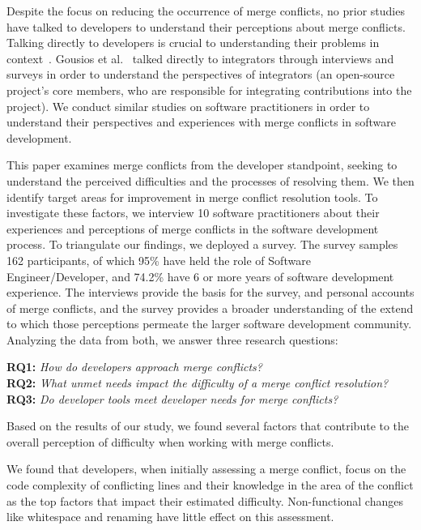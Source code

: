 Despite the focus on reducing the occurrence of merge conflicts, no prior studies have talked to developers to understand their perceptions about merge conflicts.
Talking directly to developers is crucial to understanding their problems in context~\cite{fritz2010using, sillito2006questions, de2008answering, ko2007information}.
Gousios et al.~\cite{integrator_perspective} talked directly to integrators through interviews and surveys in order to understand the perspectives of integrators (an open-source project's core members, who are responsible for integrating contributions into the project).
We conduct similar studies on software practitioners in order to understand their perspectives and experiences with merge conflicts in software development.

This paper examines merge conflicts from the developer standpoint, seeking to understand the perceived difficulties and the processes of resolving them.
We then identify target areas for improvement in merge conflict resolution tools.
To investigate these factors, we interview 10 software practitioners about their experiences and perceptions of merge conflicts in the software development process.
To triangulate our findings, we deployed a survey.
The survey samples 162 participants, of which 95\% have held the role of Software Engineer/Developer, and 74.2\% have 6 or more years of software development experience.
The interviews provide the basis for the survey, and personal accounts of merge conflicts, and the survey provides a broader understanding of the extend to which those perceptions permeate the larger software development community.
Analyzing the data from both, we answer three research questions:

\vspace{3px}
\noindent\textbf{RQ1:} \textit{How do developers approach merge conflicts?}\\
\noindent\textbf{RQ2:} \textit{What unmet needs impact the difficulty of a merge conflict resolution?}\\
\noindent\textbf{RQ3:} \textit{Do developer tools meet developer needs for merge conflicts?}
\vspace{3px}

Based on the results of our study, we found several factors that contribute to the overall perception of difficulty when working with merge conflicts.

We found that developers, when initially assessing a merge conflict, focus on the code complexity of conflicting lines and their knowledge in the area of the conflict as the top factors that impact their estimated difficulty.
Non-functional changes like whitespace and renaming have little effect on this assessment. 

